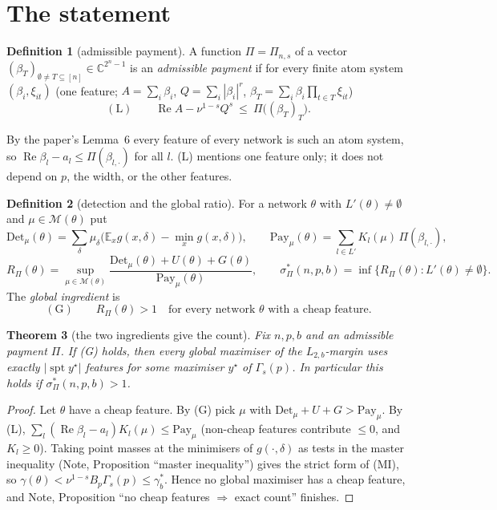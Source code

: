 \documentclass[11pt]{article}
\newtheorem{theorem}{Theorem}
\theoremstyle{definition}
\newtheorem{definition}[theorem]{Definition}
\renewcommand{\Re}{\operatorname{Re}}
\begin{document}
\section{The statement}
\begin{definition}[admissible payment]
A function $\Pi=\Pi_{n,s}$ of a vector $(\beta_T)_{\emptyset\ne T\subseteq[n]}\in\mathbb C^{2^n-1}$ is an \emph{admissible payment} if for every
finite atom system $(\beta_i,\xi_{it})$ (one feature; $A=\sum_i\beta_i$, $Q=\sum_i|\beta_i|^r$, $\beta_T=\sum_i\beta_i\prod_{t\in T}\xi_{it}$)
\[(\mathrm L)\qquad \Re A-\nu^{1-s}Q^s\ \le\ \Pi\big((\beta_T)_T\big).\]
\end{definition}
By the paper's Lemma~6 every feature of every network is such an atom system, so $\Re\beta_l-a_l\le\Pi(\beta_{l,\cdot})$ for all $l$.
(L) mentions one feature only; it does not depend on $p$, the width, or the other features.

\begin{definition}[detection and the global ratio]
For a network $\theta$ with $L'(\theta)\neq\emptyset$ and $\mu\in\mathcal M(\theta)$ put
\[\mathrm{Det}_\mu(\theta)=\sum_\delta\mu_\delta\big(\mathbb E_xg(x,\delta)-\min_xg(x,\delta)\big),\qquad
\mathrm{Pay}_\mu(\theta)=\sum_{l\in L'}K_l(\mu)\,\Pi(\beta_{l,\cdot}),\]
\[R_\Pi(\theta)=\sup_{\mu\in\mathcal M(\theta)}\frac{\mathrm{Det}_\mu(\theta)+U(\theta)+G(\theta)}{\mathrm{Pay}_\mu(\theta)},\qquad
\sigma^*_\Pi(n,p,b)=\inf\{R_\Pi(\theta):L'(\theta)\ne\emptyset\}.\]
The \emph{global ingredient} is
\[(\mathrm G)\qquad R_\Pi(\theta)>1\quad\text{for every network $\theta$ with a cheap feature.}\]
\end{definition}

\begin{theorem}[the two ingredients give the count]\label{thm:main}
Fix $n,p,b$ and an admissible payment $\Pi$.  If (G) holds, then every global maximiser of the $L_{2,b}$-margin uses exactly
$|\operatorname{spt}y^\star|$ features for some maximiser $y^\star$ of $\Gamma_s(p)$.  In particular this holds if $\sigma^*_\Pi(n,p,b)>1$.
\end{theorem}
\begin{proof}
Let $\theta$ have a cheap feature.  By (G) pick $\mu$ with $\mathrm{Det}_\mu+U+G>\mathrm{Pay}_\mu$.  By (L), $\sum_l(\Re\beta_l-a_l)K_l(\mu)\le\mathrm{Pay}_\mu$
(non-cheap features contribute $\le0$, and $K_l\ge0$).  Taking point masses at the minimisers of $g(\cdot,\delta)$ as tests in the master
inequality (Note, Proposition ``master inequality'') gives the strict form of (MI), so $\gamma(\theta)<\nu^{1-s}B_p\Gamma_s(p)\le\gamma^*_b$.
Hence no global maximiser has a cheap feature, and Note, Proposition ``no cheap features $\Rightarrow$ exact count'' finishes.
\end{proof}
\end{document}
